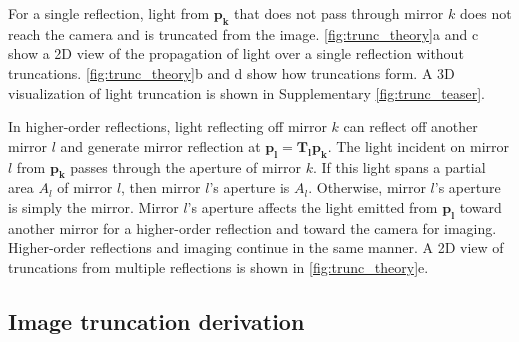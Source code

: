 For a single reflection, light from $\bm{p_k}$ that does not pass through mirror 
$k$ does not reach the camera and is truncated from the image.
\cref{fig:trunc_theory}a and c show a 2D view of the propagation of light over a single reflection without truncations.
\cref{fig:trunc_theory}b and d show how truncations form.
A 3D visualization of light truncation is shown in Supplementary \cref*{fig:trunc_teaser}.




In higher-order reflections, light reflecting off mirror $k$ can 
reflect off another mirror $l$ and generate mirror reflection 
at $\bm{p_l}=\bm{T_l} \bm{p_k}$.
The light incident on mirror $l$ from $\bm{p_k}$ passes through the aperture 
of mirror $k$.
If this light spans a partial area $A_l$ of mirror $l$, then mirror $l$'s aperture is $A_l$.
Otherwise, mirror $l$'s aperture is simply the mirror.
Mirror $l$'s aperture affects the light emitted from $\bm{p_l}$ toward another 
mirror for a higher-order reflection and toward the camera for imaging.
Higher-order reflections and imaging continue in the same manner.
A 2D view of truncations from multiple reflections is shown in \cref{fig:trunc_theory}e.


\subsection{Image truncation derivation} \label{sec:image_truncations}

